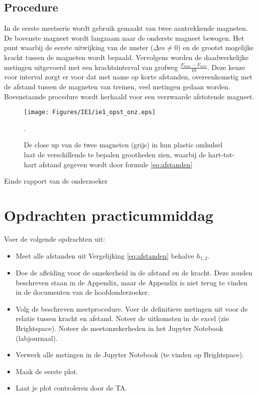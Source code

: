 \subsection{Procedure}
In de eerste meetserie wordt gebruik gemaakt van twee aantrekkende magneten. De bovenste magneet wordt langzaam naar de onderste magneet bewogen. Het punt waarbij de eerste uitwijking van de unster ($\Delta m \ne 0$) en de grootst mogelijke kracht tussen de magneten wordt bepaald. Vervolgens worden de daadwerkelijke metingen uitgevoerd met een krachtsinterval van grofweg $\frac{F_{max}-F_{min}}{10}$. Deze keuze voor interval zorgt er voor dat met name op korte afstanden, overeenkomstig met de afstand tussen de magneten van treinen, veel metingen gedaan worden. Bovenstaande procedure wordt herhaald voor een verzwaarde afstotende magneet. 
%
\begin{figure}[h!]
    \centering
    \texttt{[image: Figures/IE1/ie1\_opst\_onz.eps]}
    \caption{De close up van de twee magneten (grijs) in hun plastic omhulsel laat de verschillende te bepalen grootheden zien, waarbij de hart-tot-hart afstand gegeven wordt door formule \ref{eq:afstanden}}.
    \label{fig:IE1opst_onz}
\end{figure}

\begin{center}
    \LARGE{Einde rapport van de onderzoeker}
\end{center}



\newpage
%
\section{Opdrachten practicummiddag}
Voer de volgende opdrachten uit:
\begin{itemize}
    \item Meet alle afstanden uit Vergelijking \ref{eq:afstanden} behalve $h_{1,2}$.
    \item Doe de afleiding voor de onzekerheid in de afstand en de kracht. Deze zouden beschreven staan in de Appendix, maar de Appendix is niet terug te vinden in de documenten van de hoofdonderzoeker.
    \item Volg de beschreven meetprocedure. Voer de definitieve metingen uit voor de relatie tussen kracht en afstand. Noteer de uitkomsten in de excel (zie Brightspace). Noteer de meetonzekerheden in het Jupyter Notebook (labjournaal).
    \item Verwerk alle metingen in de Jupyter Notebook (te vinden op Brightspace).
    \item Maak de eerste plot.
    \item Laat je plot controleren door de TA.
\end{itemize}
%
\newpage
\newpage
